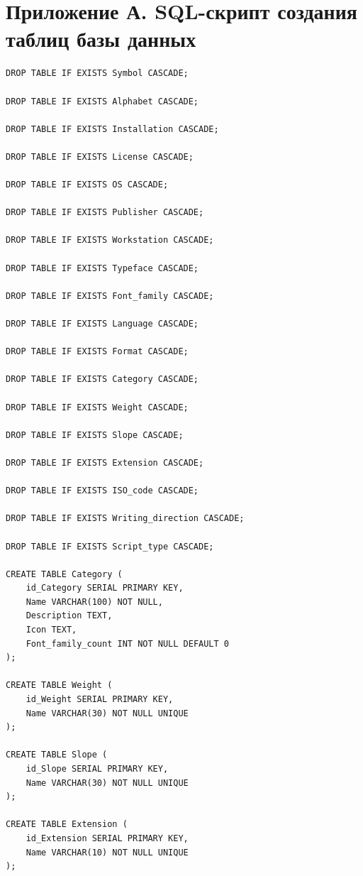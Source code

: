 \section*{Приложение А. SQL-скрипт создания таблиц базы данных}
\label{app:init-sql}

\renewcommand{\theFancyVerbLine}{%
    \scriptsize\ttfamily\textcolor{gray}{\arabic{FancyVerbLine}}%
}

\begin{verbatim}
DROP TABLE IF EXISTS Symbol CASCADE;

DROP TABLE IF EXISTS Alphabet CASCADE;

DROP TABLE IF EXISTS Installation CASCADE;

DROP TABLE IF EXISTS License CASCADE;

DROP TABLE IF EXISTS OS CASCADE;

DROP TABLE IF EXISTS Publisher CASCADE;

DROP TABLE IF EXISTS Workstation CASCADE;

DROP TABLE IF EXISTS Typeface CASCADE;

DROP TABLE IF EXISTS Font_family CASCADE;

DROP TABLE IF EXISTS Language CASCADE;

DROP TABLE IF EXISTS Format CASCADE;

DROP TABLE IF EXISTS Category CASCADE;

DROP TABLE IF EXISTS Weight CASCADE;

DROP TABLE IF EXISTS Slope CASCADE;

DROP TABLE IF EXISTS Extension CASCADE;

DROP TABLE IF EXISTS ISO_code CASCADE;

DROP TABLE IF EXISTS Writing_direction CASCADE;

DROP TABLE IF EXISTS Script_type CASCADE;

CREATE TABLE Category (
    id_Category SERIAL PRIMARY KEY,
    Name VARCHAR(100) NOT NULL,
    Description TEXT,
    Icon TEXT,
    Font_family_count INT NOT NULL DEFAULT 0
);

CREATE TABLE Weight (
    id_Weight SERIAL PRIMARY KEY,
    Name VARCHAR(30) NOT NULL UNIQUE
);

CREATE TABLE Slope (
    id_Slope SERIAL PRIMARY KEY,
    Name VARCHAR(30) NOT NULL UNIQUE
);

CREATE TABLE Extension (
    id_Extension SERIAL PRIMARY KEY,
    Name VARCHAR(10) NOT NULL UNIQUE
);


\end{verbatim}
